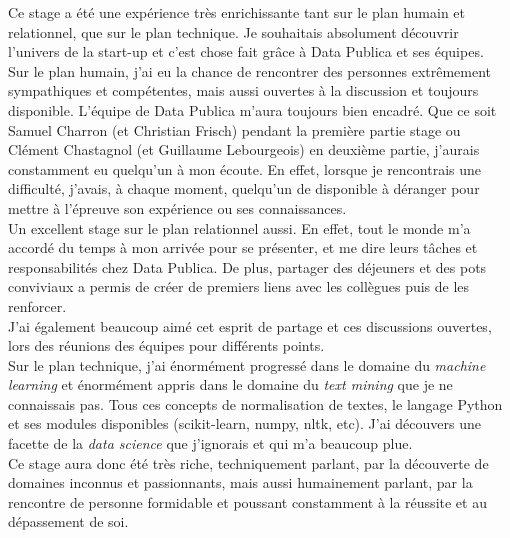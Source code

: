 Ce stage a été une expérience très enrichissante tant sur le plan humain et relationnel, que sur le plan technique. Je souhaitais absolument découvrir l'univers de la start-up et c'est chose fait grâce à Data Publica et ses équipes.\\

Sur le plan humain, j'ai eu la chance de rencontrer des personnes extrêmement sympathiques et compétentes, mais aussi ouvertes à la discussion et toujours disponible. L'équipe de Data Publica m'aura toujours bien encadré. Que ce soit Samuel Charron (et Christian Frisch) pendant la première partie stage ou Clément Chastagnol (et Guillaume Lebourgeois) en deuxième partie, j'aurais constamment eu quelqu'un à mon écoute. En effet, lorsque je rencontrais une difficulté, j'avais, à chaque moment, quelqu'un de disponible à \og déranger \fg pour mettre à l'épreuve son expérience ou ses connaissances.\\

Un excellent stage sur le plan relationnel aussi. En effet, tout le monde m'a accordé du temps à mon arrivée pour se présenter, et me dire leurs tâches et responsabilités chez Data Publica. De plus, partager des déjeuners et des pots conviviaux a permis de créer de premiers liens avec les collègues puis de les renforcer.\\

J'ai également beaucoup aimé cet esprit de partage et ces discussions ouvertes, lors des réunions des équipes pour différents points.\\

Sur le plan technique, j'ai énormément progressé dans le domaine du \textit{machine learning} et énormément appris dans le domaine du \textit{text mining} que je ne connaissais pas. Tous ces concepts de normalisation de textes, le langage Python et ses modules disponibles (scikit-learn, numpy, nltk, etc). J'ai découvers une facette de la \textit{data science} que j'ignorais et qui m'a beaucoup plue.\\

Ce stage aura donc été très riche, techniquement parlant, par la découverte de domaines inconnus et passionnants, mais aussi humainement parlant, par la rencontre de personne formidable et poussant constamment à la réussite et au dépassement de soi.

